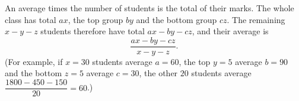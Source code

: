 An average times the number of students is the total of their marks. The whole class has total $ax$, the top group $by$ and the bottom group $cz$. The remaining $x-y-z$ students therefore have total $ax-by-cz$, and their average is
\[\boxed{\dfrac{ax-by-cz}{x-y-z}}.\]
(For example, if $x=30$ students average $a=60$, the top $y=5$ average $b=90$ and the bottom $z=5$ average $c=30$, the other $20$ students average $\dfrac{1800-450-150}{20}=60$.)

